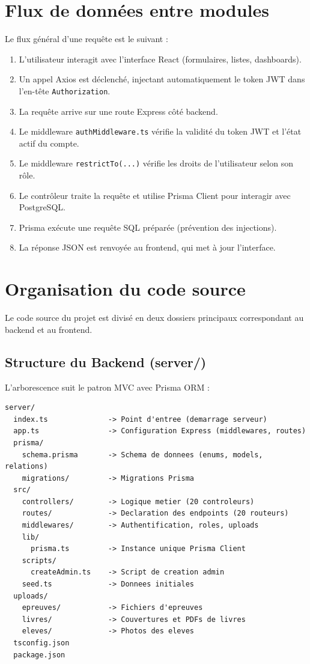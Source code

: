 \documentclass[12pt,a4paper]{report}
\begin{document}
\section{Flux de données entre modules}
Le flux général d'une requête est le suivant :
\begin{enumerate}[leftmargin=*]
    \item L'utilisateur interagit avec l'interface React (formulaires, listes, dashboards).
    \item Un appel Axios est déclenché, injectant automatiquement le token JWT dans l'en-tête \texttt{Authorization}.
    \item La requête arrive sur une route Express côté backend.
    \item Le middleware \texttt{authMiddleware.ts} vérifie la validité du token JWT et l'état actif du compte.
    \item Le middleware \texttt{restrictTo(...)} vérifie les droits de l'utilisateur selon son rôle.
    \item Le contrôleur traite la requête et utilise Prisma Client pour interagir avec PostgreSQL.
    \item Prisma exécute une requête SQL préparée (prévention des injections).
    \item La réponse JSON est renvoyée au frontend, qui met à jour l'interface.
\end{enumerate}
 
\section{Organisation du code source}
Le code source du projet est divisé en deux dossiers principaux correspondant au backend et au frontend.

\subsection*{Structure du Backend (server/)}
L'arborescence suit le patron MVC avec Prisma ORM :

\begin{lstlisting}
server/
  index.ts              -> Point d'entree (demarrage serveur)
  app.ts                -> Configuration Express (middlewares, routes)
  prisma/
    schema.prisma       -> Schema de donnees (enums, models, relations)
    migrations/         -> Migrations Prisma
  src/
    controllers/        -> Logique metier (20 controleurs)
    routes/             -> Declaration des endpoints (20 routeurs)
    middlewares/        -> Authentification, roles, uploads
    lib/
      prisma.ts         -> Instance unique Prisma Client
    scripts/
      createAdmin.ts    -> Script de creation admin
    seed.ts             -> Donnees initiales
  uploads/
    epreuves/           -> Fichiers d'epreuves
    livres/             -> Couvertures et PDFs de livres
    eleves/             -> Photos des eleves
  tsconfig.json
  package.json
\end{lstlisting}
\end{document}
